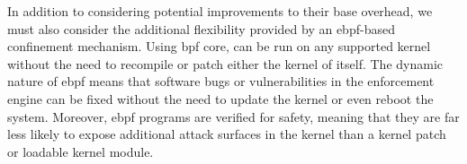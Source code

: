 In addition to considering potential improvements to their base overhead, we must also
consider the additional flexibility provided by an \gls{ebpf}-based confinement mechanism.
Using \gls{bpf} \gls{core}, \bpfcontain{} can be run on any supported kernel without the
need to recompile or patch either the kernel of \bpfcontain{} itself. The dynamic nature
of \gls{ebpf} means that software bugs or vulnerabilities in the enforcement engine can be
fixed without the need to update the kernel or even reboot the system. Moreover,
\gls{ebpf} programs are verified for safety, meaning that they are far less likely to
expose additional attack surfaces in the kernel than a kernel patch or loadable kernel
module.




